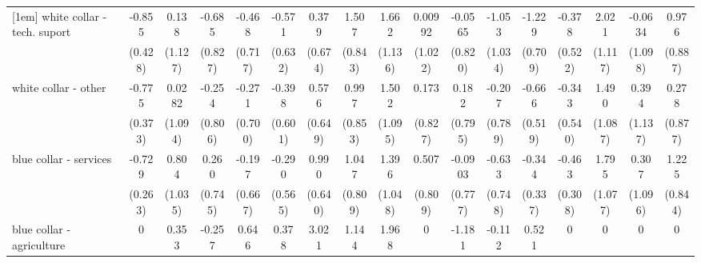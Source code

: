 {\begin{tabular}{l*{16}{c}}
[1em]
white collar - tech. suport&      -0.855\sym{*}  &       0.138         &      -0.685         &      -0.468         &      -0.571         &       0.379         &       1.507         &       1.662         &     0.00992         &     -0.0565         &      -1.053         &      -1.229         &      -0.378         &       2.021         &     -0.0634         &       0.976         \\
                    &     (0.428)         &     (1.127)         &     (0.827)         &     (0.717)         &     (0.632)         &     (0.674)         &     (0.843)         &     (1.136)         &     (1.022)         &     (0.820)         &     (1.034)         &     (0.709)         &     (0.522)         &     (1.117)         &     (1.098)         &     (0.887)         \\
[1em]
white collar - other&      -0.775\sym{*}  &      0.0282         &      -0.254         &      -0.271         &      -0.398         &       0.576         &       0.997         &       1.502         &       0.173         &       0.182         &      -0.207         &      -0.666         &      -0.343         &       1.490         &       0.394         &       0.278         \\
                    &     (0.373)         &     (1.094)         &     (0.806)         &     (0.700)         &     (0.601)         &     (0.649)         &     (0.853)         &     (1.095)         &     (0.827)         &     (0.795)         &     (0.789)         &     (0.519)         &     (0.540)         &     (1.087)         &     (1.137)         &     (0.877)         \\
[1em]
blue collar - services&      -0.729\sym{**} &       0.804         &       0.260         &      -0.197         &      -0.290         &       0.990         &       1.047         &       1.396         &       0.507         &     -0.0903         &      -0.633         &      -0.344         &      -0.463         &       1.795         &       0.307         &       1.225         \\
                    &     (0.263)         &     (1.035)         &     (0.745)         &     (0.667)         &     (0.565)         &     (0.640)         &     (0.809)         &     (1.048)         &     (0.809)         &     (0.777)         &     (0.748)         &     (0.337)         &     (0.308)         &     (1.077)         &     (1.096)         &     (0.844)         \\
[1em]
blue collar - agriculture&           0         &       0.353         &      -0.257         &       0.646         &       0.378         &       3.021\sym{***}&       1.144         &       1.968         &           0         &      -1.181         &      -0.112         &       0.521         &           0         &           0         &           0         &           0         \\

\end{tabular}}
